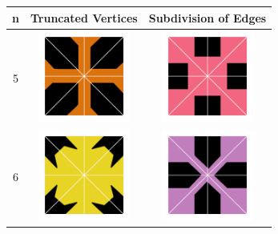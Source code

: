 \documentclass{beamer}
\begin{document}
\begin{frame}
\begin{table}
\centering
\begin{tabular}{c|c|c}
n & Truncated Vertices & Subdivision of Edges \\\hline
5 & \includegraphics[width=3cm]{20tv} &\includegraphics[width=3cm]{20se} \\\hline
6 &\includegraphics[width=3cm]{24_tv} &\includegraphics[width=3cm]{24se}\\\hline
\end{tabular}
\end{table}
\end{frame}
\end{document}
